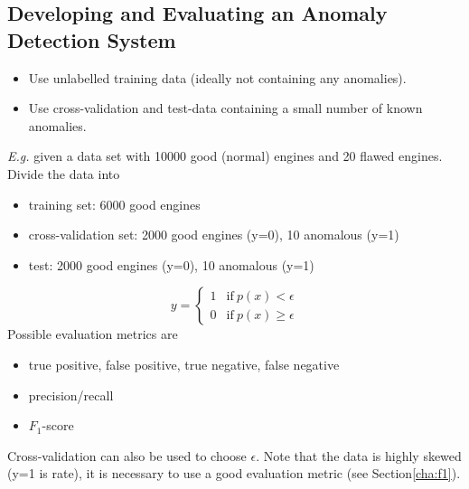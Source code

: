 \documentclass[a4paper,twoside,10pt]{article}
\begin{document}
\subsection{Developing and Evaluating an Anomaly Detection System}
\begin{itemize}
  \item Use unlabelled training data (ideally not containing any anomalies).
  \item Use cross-validation and test-data containing a small number of known anomalies.
\end{itemize}
\emph{E.g.} given a data set with 10000 good (normal) engines and 20 flawed engines.
Divide the data into
\begin{itemize}
  \item training set: 6000 good engines
  \item cross-validation set: 2000 good engines (y=0), 10 anomalous (y=1)
  \item test: 2000 good engines (y=0), 10 anomalous (y=1)
\end{itemize}
\begin{equation*}
  y=\left\{\begin{array}{ll}1&\mathrm{if\ }p(x)<\epsilon\\0&\mathrm{if\ }p(x)\ge\epsilon\end{array}\right.
\end{equation*}
Possible evaluation metrics are
\begin{itemize}
  \item true positive, false positive, true negative, false negative
  \item precision/recall
  \item $F_1$-score
\end{itemize}
Cross-validation can also be used to choose $\epsilon$.
Note that the data is highly skewed (y=1 is rate), it is necessary to use a good evaluation metric (see Section\ref{cha:f1}).
\end{document}
